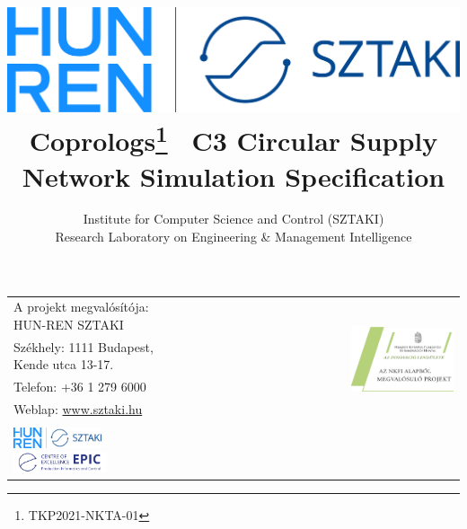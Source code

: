 \documentclass{article}
\begin{document}
\begin{titlepage}
       \vfill
            

		\noindent
       \begin{tabular}{lr}
       		{\scriptsize A projekt megvalósítója: HUN-REN SZTAKI} & \multirow{5}{0.35\textwidth}{\includegraphics[width=0.4\textwidth]{nkfi.png}} \\
			{\scriptsize Székhely: 1111 Budapest, Kende utca 13-17.} & \\
			{\scriptsize Telefon: +36 1 279 6000} & \\
			{\scriptsize Weblap: \href{www.sztaki.hu}{www.sztaki.hu}} & \\
			&\\[4mm]
			\includegraphics[height=6mm]{sztaki.png} \includegraphics[height=6mm]{epic.png} & \\
       \end{tabular}
\end{titlepage}

\title{\includegraphics[scale=0.08]{sztaki.png} \\[1cm] Coprologs\footnote{TKP2021-NKTA-01} ~C3 Circular Supply Network Simulation Specification}
\author{Institute for Computer Science and Control (SZTAKI) \\ Research Laboratory on Engineering \& Management Intelligence}
\end{document}
